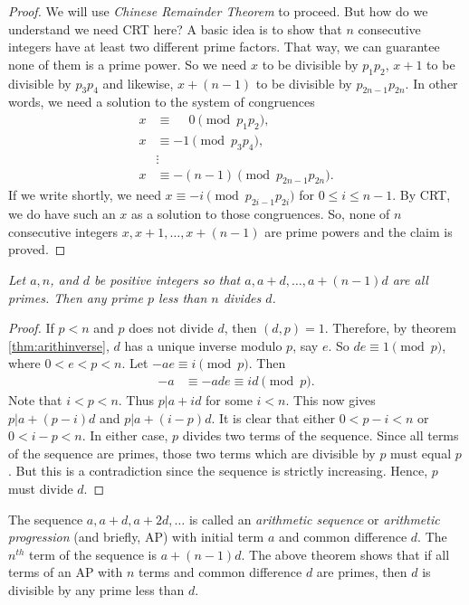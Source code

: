 \documentclass{subfiles}
\begin{document}
	\begin{proof}
		We will use \textit{Chinese Remainder Theorem} to proceed. But how do we understand we need CRT here? A basic idea is to show that $n$ consecutive integers have at least two different prime factors. That way, we can guarantee none of them is a prime power. So we need $x$ to be divisible by $p_1p_2$, $x+1$ to be divisible by $p_3p_4$ and likewise, $x+(n-1)$ to be divisible by $p_{2n-1}p_{2n}$. In other words, we need a solution to the system of congruences
			\begin{align*}
				x & \equiv \phantom{-} 0  \pmod {p_1p_2},\\
				x & \equiv -1  \pmod{p_3p_4},\\
				  &  \vdots \\
				x & \equiv -(n-1) \pmod{p_{2n-1}p_{2n}}.
			\end{align*}
		If we write shortly, we need $x\equiv-i\pmod{p_{2i-1}p_{2i}}$ for $0\leq i\leq n-1$. By CRT, we do have such an $x$ as a solution to those congruences. So, none of $n$ consecutive integers $x, x+1, \ldots, x+(n-1)$ are prime powers and the claim is proved.
	\end{proof}
	
	\begin{theorem}\slshape
		Let $a,n$, and $d$ be positive integers so that $a,a+d,\ldots,a+(n-1)d$ are all primes. Then any prime $p$ less than $n$ divides $d$. 
	\end{theorem}
	
	\begin{proof}
		If $p<n$ and $p$ does not divide $d$, then $(d,p)=1$. Therefore, by theorem \eqref{thm:arithinverse}, $d$ has a unique inverse modulo $p$, say $e$. So $de\equiv1\pmod p$, where $0<e<p<n$. Let $-ae \equiv i \pmod p$. Then 
			\begin{align*}
				-a & \equiv -ade \equiv id \pmod p.
			\end{align*}
		Note that $i<p<n$. Thus $p|a+id$ for some $i<n$. This now gives $p|a+(p-i)d$ and $p|a+(i-p)d$. It is clear that either $0<p-i<n$ or $0<i-p<n$. In either case, $p$ divides two terms of the sequence. Since all terms of the sequence are primes, those two terms which are divisible by $p$ must equal $p$. But this is a contradiction since the sequence is strictly increasing. Hence, $p$ must divide $d$.
	\end{proof}
	
	\begin{remark}
		The sequence $a, a+d, a+2d, \ldots$ is called an \textit{arithmetic sequence} or \textit{arithmetic progression} (and briefly, AP) with initial term $a$ and common difference $d$. The $n^{th}$ term of the sequence is $a+(n-1)d$. The above theorem shows that if all terms of an AP with $n$ terms and common difference $d$ are primes, then $d$ is divisible by any prime less than $d$.
	\end{remark}
	
\end{document}

